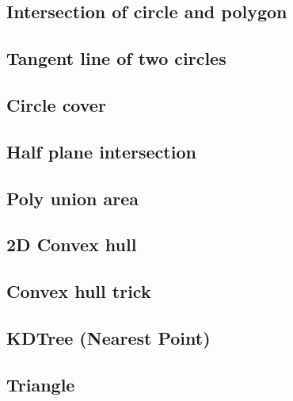 \documentclass[a4paper,10pt,twocolumn,oneside]{article}
\begin{document}
\subsection{Intersection of circle and polygon}


\subsection{Tangent line of two circles}


\subsection{Circle cover}


\subsection{Half plane intersection}


\subsection{Poly union area}


\subsection{2D Convex hull}


\subsection{Convex hull trick}


\subsection{KDTree (Nearest Point)}


\subsection{Triangle}

\end{document}
